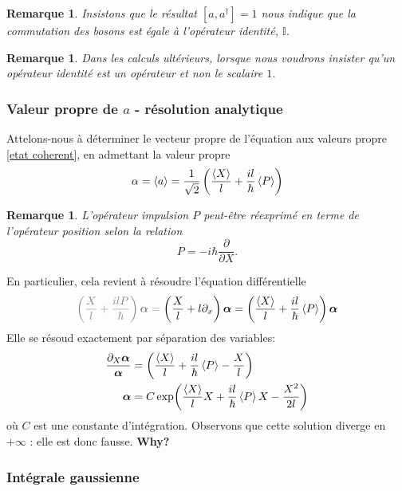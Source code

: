 \documentclass[11pt,oneside,a4paper]{article}
\newcommand{\h}{\ensuremath{\hbar}}
\newtheorem{remark}[theorem]{Remarque}
\begin{document}
\begin{remark}
  Insistons que le résultat $[a,a^\dagger] = 1$ nous indique que la commutation des bosons est égale à l'opérateur identité, $\mathbb{I}$.
\end{remark}

\begin{remark}
  Dans les calculs ultérieurs, lorsque nous voudrons insister qu'un opérateur identité est un opérateur et non le scalaire $1$.
\end{remark}

\subsubsection{Valeur propre de $a$ - résolution analytique}

Attelons-nous à déterminer le vecteur propre de l'équation aux valeurs propre \eqref{etat coherent}, en admettant la valeur propre 
\begin{equation}
  \label{valeur propre}
  \alpha = \expval{a} = \frac{1}{\sqrt{2}}\left(\frac{\expval{X}}{l}+\frac{il}{\h}\expval{P}\right)
\end{equation}

\begin{remark}
  L'opérateur impulsion $P$ peut-être réexprimé en terme de l'opérateur position selon la relation 
  \begin{equation}
    P = -i\h\frac{\partial}{\partial X}.
  \end{equation}
\end{remark}
En particulier, cela revient à résoudre l'équation différentielle
\begin{equation}
  \color{gray}\left(\frac{X}{l}+\frac{ilP}{\hbar}\right)\bm{\alpha} = \color{black}\left(\frac{X}{l}+l\partial_x\right)\bm{\alpha} = \left(\frac{\expval{X}}{l}+\frac{il}{\h}\expval{P}\right)\bm{\alpha}
\end{equation}
Elle se résoud exactement par séparation des variables:
\begin{align}
  \frac{\partial_X \bm{\alpha}}{\bm{\alpha}} &= \left(\frac{\expval{X}}{l}+\frac{il}{\h}\expval{P}-\frac{X}{l}\right) \\
  \bm{\alpha} &= C\exp(\frac{\expval{X}}{l}X+\frac{il}{\h}\expval{P}X-\frac{X^2}{2l})
\end{align}
où $C$ est une constante d'intégration. Observons que cette solution diverge en $+\infty$ : \color{red} elle est donc fausse. \textbf{Why?} \color{black}

\subsubsection{Intégrale gaussienne}
\end{document}

